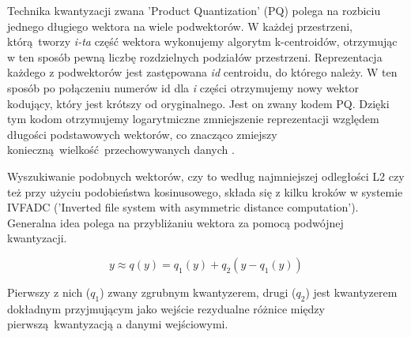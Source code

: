 Technika kwantyzacji zwana 'Product Quantization' (PQ) polega na rozbiciu jednego długiego wektora na wiele podwektorów. W każdej przestrzeni, którą tworzy \emph{i-ta} część wektora wykonujemy algorytm k-centroidów, otrzymując w ten sposób pewną liczbę rozdzielnych podziałów przestrzeni. Reprezentacja każdego z podwektorów jest zastępowana \emph{id} centroidu, do którego należy. W ten sposób po połączeniu numerów id dla \emph{i} części otrzymujemy nowy wektor kodujący, który jest krótszy od oryginalnego. Jest on zwany kodem PQ. Dzięki tym kodom otrzymujemy logarytmiczne zmniejszenie reprezentacji względem długości podstawowych wektorów, co znacząco zmiejszy konieczną wielkość przechowywanych danych \autocite{productquantaization}. \newline

Wyszukiwanie podobnych wektorów, czy to według najmniejszej odległości L2 czy też przy użyciu podobieństwa kosinusowego, składa się z kilku kroków w systemie IVFADC ('Inverted file system with asymmetric distance computation'). Generalna idea polega na przybliżaniu wektora za pomocą podwójnej kwantyzacji.

\begin{equation}
	y \approx q(y) = q_1(y) + q_2(y - q_1(y))
\end{equation}

Pierwszy z nich (\emph{$q_1$}) zwany zgrubnym kwantyzerem, drugi (\emph{$q_2$}) jest kwantyzerem dokładnym przyjmującym jako wejście rezydualne różnice między pierwszą kwantyzacją a danymi wejściowymi.\newline

